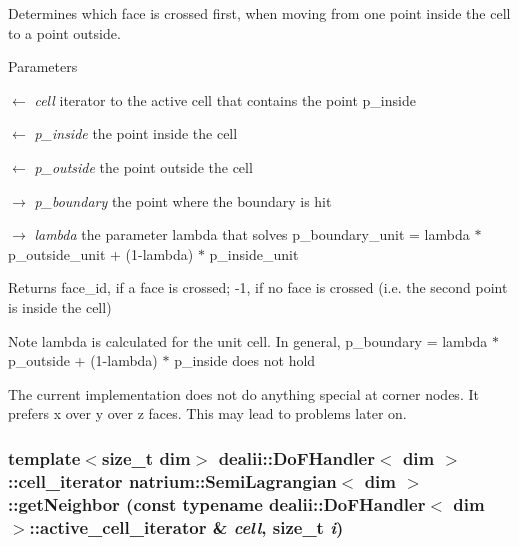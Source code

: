 Determines which face is crossed first, when moving from one point inside the cell to a point outside. 
\begin{DoxyParams}{Parameters}
\item[\mbox{$\leftarrow$} {\em cell}]iterator to the active cell that contains the point p\_\-inside \item[\mbox{$\leftarrow$} {\em p\_\-inside}]the point inside the cell \item[\mbox{$\leftarrow$} {\em p\_\-outside}]the point outside the cell \item[\mbox{$\rightarrow$} {\em p\_\-boundary}]the point where the boundary is hit \item[\mbox{$\rightarrow$} {\em lambda}]the parameter lambda that solves p\_\-boundary\_\-unit = lambda $\ast$ p\_\-outside\_\-unit + (1-\/lambda) $\ast$ p\_\-inside\_\-unit \end{DoxyParams}
\begin{DoxyReturn}{Returns}
face\_\-id, if a face is crossed; -\/1, if no face is crossed (i.e. the second point is inside the cell) 
\end{DoxyReturn}
\begin{DoxyNote}{Note}
lambda is calculated for the unit cell. In general, p\_\-boundary = lambda $\ast$ p\_\-outside + (1-\/lambda) $\ast$ p\_\-inside does not hold 

The current implementation does not do anything special at corner nodes. It prefers x over y over z faces. This may lead to problems later on. 
\end{DoxyNote}
\hypertarget{classnatrium_1_1SemiLagrangian_a5e70ea981e2070d5e9657f3df8d61979}{
\subsubsection[{getNeighbor}]{\setlength{\rightskip}{0pt plus 5cm}template$<$size\_\-t dim$>$ dealii::DoFHandler$<$ dim $>$::cell\_\-iterator {\bf natrium::SemiLagrangian}$<$ dim $>$::getNeighbor (const typename dealii::DoFHandler$<$ dim $>$::active\_\-cell\_\-iterator \& {\em cell}, \/  size\_\-t {\em i})}}
\label{classnatrium_1_1SemiLagrangian_a5e70ea981e2070d5e9657f3df8d61979}


